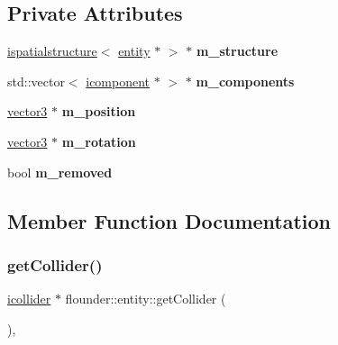 \subsection*{Private Attributes}
\begin{DoxyCompactItemize}
\item 
\mbox{\label{classflounder_1_1entity_ad6338e7f569238791e0787f80ce4d044}} 
\hyperlink{classflounder_1_1ispatialstructure}{ispatialstructure}$<$ \hyperlink{classflounder_1_1entity}{entity} $\ast$ $>$ $\ast$ {\bfseries m\+\_\+structure}
\item 
\mbox{\label{classflounder_1_1entity_a36bcdd06adf0aecdc01c934f7534fa91}} 
std\+::vector$<$ \hyperlink{classflounder_1_1icomponent}{icomponent} $\ast$ $>$ $\ast$ {\bfseries m\+\_\+components}
\item 
\mbox{\label{classflounder_1_1entity_a8d81338fb3d84ede47cbc7695214a0d4}} 
\hyperlink{classflounder_1_1vector3}{vector3} $\ast$ {\bfseries m\+\_\+position}
\item 
\mbox{\label{classflounder_1_1entity_a4d3cc88b2221b32a2f2bb97d5516957c}} 
\hyperlink{classflounder_1_1vector3}{vector3} $\ast$ {\bfseries m\+\_\+rotation}
\item 
\mbox{\label{classflounder_1_1entity_a3bf7f18a136b121b8a13c3e1226df416}} 
bool {\bfseries m\+\_\+removed}
\end{DoxyCompactItemize}


\subsection{Member Function Documentation}
\mbox{\label{classflounder_1_1entity_a4b68d0d58f2ff338058a2fa0d1a2e413}} 
\subsubsection{\texorpdfstring{get\+Collider()}{getCollider()}}
{\footnotesize\ttfamily \hyperlink{classflounder_1_1icollider}{icollider} $\ast$ flounder\+::entity\+::get\+Collider (\begin{DoxyParamCaption}{ }\end{DoxyParamCaption})\hspace{0.3cm}{\ttfamily [override]}, {\ttfamily [virtual]}}



